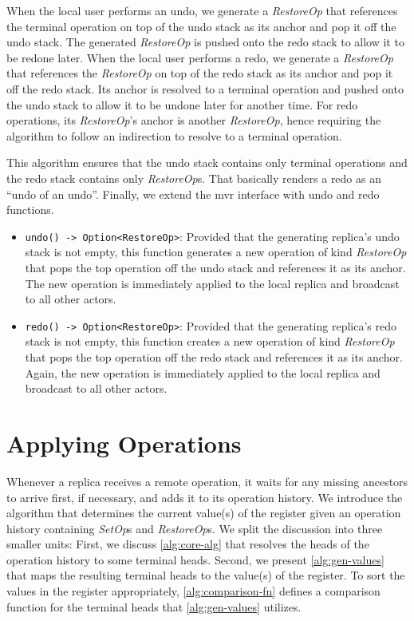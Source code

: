 \documentclass[sigplan,natbib=false,review]{acmart}
\newcommand{\setopkind}{\textit{SetOp}}
\newcommand{\restopkind}{\textit{RestoreOp}}
\begin{document}
When the local user performs an undo, we generate a \restopkind{} that
references the terminal operation on top of the undo stack as its anchor
and pop it off the undo stack.
The generated \restopkind{} is pushed onto the redo stack to allow it to be
redone later.
When the local user performs a redo, we generate a \restopkind{} that
references the \restopkind{} on top of the redo stack as its anchor and pop
it off the redo stack.
Its anchor is resolved to a terminal operation and
pushed onto the undo stack to allow it to be undone later for another time.
For redo operations, its \restopkind{}'s anchor is another \restopkind{},
hence requiring the algorithm to follow an indirection to resolve to a terminal
operation.

This algorithm ensures that the undo stack contains only terminal operations and
the redo stack contains only \restopkind{}s.
That basically renders a redo as an ``undo of an undo''.
Finally, we extend the \gls*{mvr} interface with undo and redo functions.

\begin{itemize}
  \item \texttt{undo() -> Option<RestoreOp>}:
    Provided that the generating replica's undo stack is not empty,
    this function generates a new operation of kind \restopkind{} that pops
    the top operation off the undo stack and references it as its anchor.
    The new operation is immediately applied to the local replica
    and broadcast to all other actors.
  \item \texttt{redo() -> Option<RestoreOp>}:
    Provided that the generating replica's redo stack is not empty,
    this function creates a new operation of kind \restopkind{} that pops
    the top operation off the redo stack and references it as its anchor.
    Again, the new operation is immediately applied to the local replica
    and broadcast to all other actors.
\end{itemize}

\section{Applying Operations}\label{sec:implementation}

Whenever a replica receives a remote operation, it waits for any missing
ancestors to arrive first, if necessary, and adds it to its operation history.
We introduce the algorithm that determines the current value(s) of the
register given an operation history containing \setopkind{}s and \restopkind{}s.
We split the discussion into three smaller units:
First, we discuss \autoref{alg:core-alg} that resolves the heads of the operation
history to some terminal heads.
Second, we present \autoref{alg:gen-values} that maps the resulting terminal
heads to the value(s) of the register.
To sort the values in the register appropriately, \autoref{alg:comparison-fn}
defines a comparison function for the terminal heads that \autoref{alg:gen-values}
utilizes.
\end{document}
